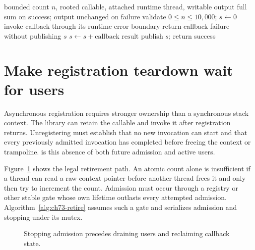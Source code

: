 \begin{algorithm}[htbp]
\caption{Visit indices with a synchronous status-returning callback.}
\label{alg:ch73-callback}
\begin{pseudocode}
\Require bounded count $n$, rooted callable, attached runtime thread, writable output
\Ensure full sum on success; output unchanged on failure
\State validate $0\le n\le10{,}000$; $s\gets0$
  \State invoke callback through its runtime error boundary
    \State return callback failure without publishing $s$
  \EndIf
  \State $s\gets s+\text{callback result}$
\EndFor
\State publish $s$; return success
\end{pseudocode}
\end{algorithm}

\section{Make registration teardown wait for users}
\label{sec:ch73-quiescence}
Asynchronous registration requires stronger ownership than a synchronous stack context.
The library can retain the callable and invoke it after registration returns.
Unregistering must establish that no new invocation can start and that every previously admitted invocation has completed before freeing the context or trampoline.
 is this absence of both future admission and active users.

Figure~\ref{fig:ch73-stop} shows the legal retirement path.
An atomic count alone is insufficient if a thread can read a raw context pointer before another thread frees it and only then try to increment the count.
Admission must occur through a registry or other stable gate whose own lifetime outlasts every attempted admission.
Algorithm~\ref{alg:ch73-retire} assumes such a gate and serializes admission and stopping under its mutex.

\begin{figure}[htbp]
\centering
{}
\caption{Stopping admission precedes draining users and reclaiming callback state.}
\label{fig:ch73-stop}
\end{figure}

